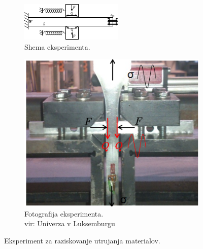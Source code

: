 \documentclass[12pt,a4paper,twoside]{article}
\theoremstyle{definition} %
\theoremstyle{plain} %
\numberwithin{equation}{section}
\begin{document}
\begin{figure}[!h]
  \begin{subfigure}[t]{0.60\textwidth}
    \centering
    \includegraphics[width=\textwidth]{images/fwo_shema.pdf}
    \caption{Shema eksperimenta.}
    \label{fig:fwo-shema}
  \end{subfigure}
  \hspace{1em}
  \begin{subfigure}[t]{0.35\textwidth}
    \centering
    \includegraphics[width=\textwidth]{images/experiment.png}
    \caption[Fotografija eksperimenta.]{Fotografija eksperimenta. \\ vir: Univerza v Luksemburgu}
    \label{fig:fwo-experiment}
  \end{subfigure}
  \caption[Eksperiment za raziskovanje utrujanja materialov.]{Eksperiment za raziskovanje utrujanja materialov.}
\end{figure}
\end{document}
